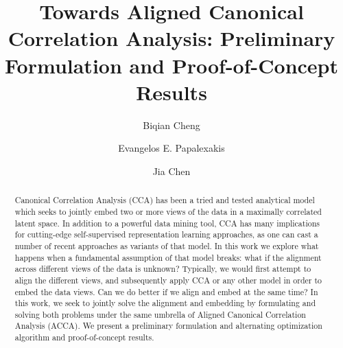 \documentclass[sigconf]{acmart}
\begin{document}


\title{Towards Aligned Canonical Correlation Analysis: Preliminary Formulation and Proof-of-Concept Results}


\author{Biqian Cheng}

\author{Evangelos E. Papalexakis}
 
 \author{Jia Chen}




\begin{abstract}
Canonical Correlation Analysis (CCA) has been a tried and tested analytical model which seeks to jointly embed two or more views of the data in a maximally correlated latent space. In addition to a powerful data mining tool, CCA has many implications for cutting-edge self-supervised representation learning approaches, as one can cast a number of recent approaches as variants of that model. In this work we explore what happens when a fundamental assumption of that model breaks: what if the alignment across different views of the data is unknown? Typically, we would first attempt to align the different views, and subsequently apply CCA or any other model in order to embed the data views. Can we do better if we align and embed at the same time? In this work, we seek to jointly solve the alignment and embedding by formulating and solving both problems under the same umbrella of Aligned Canonical Correlation Analysis (ACCA). We present a preliminary formulation and alternating optimization algorithm and proof-of-concept results.

\end{abstract}
\end{document}
